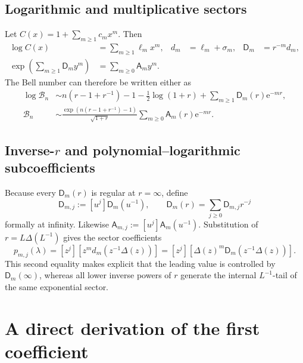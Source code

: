 \documentclass[11pt,a4paper]{article}
\theoremstyle{definition}
\theoremstyle{remark}
\newcommand{\Bell}{\mathcal B}
\newcommand{\ee}{\mathrm e}
\newcommand{\coef}[2]{[#1^{#2}]}
\newcommand{\cA}{\mathsf A}
\newcommand{\cD}{\mathsf D}
\begin{document}
\subsection{Logarithmic and multiplicative sectors}

Let \(C(x)=1+\sum_{m\ge1}c_mx^m\).  Then
\begin{align}
 \log C(x)&=\sum_{m\ge1}\ell_mx^m,
 &d_m&=\ell_m+\sigma_m,
 &\cD_m&=r^{-m}d_m,
 \label{eq:dict-log}\\
 \exp\!\left(\sum_{m\ge1}\cD_my^m\right)
 &=\sum_{m\ge0}\cA_my^m.
 \label{eq:dict-mult}
\end{align}
The Bell number can therefore be written either as
\begin{align}
 \log\Bell_n
 &\sim n(r-1+r^{-1})-1-\tfrac12\log(1+r)
       +\sum_{m\ge1}\cD_m(r)\ee^{-mr},
 \label{eq:dict-logbell}\\
 \Bell_n
 &\sim \frac{\exp(n(r-1+r^{-1})-1)}{\sqrt{1+r}}
       \sum_{m\ge0}\cA_m(r)\ee^{-mr}.
 \label{eq:dict-multbell}
\end{align}

\subsection{Inverse-\texorpdfstring{\(r\)}{r} and polynomial--logarithmic subcoefficients}

Because every \(\cD_m(r)\) is regular at \(r=\infty\), define
\begin{equation}\label{eq:Dmk-def}
 \cD_{m,j}:=\coef{u}{j}\cD_m(u^{-1}),
 \qquad
 \cD_m(r)=\sum_{j\ge0}\cD_{m,j}r^{-j}
\end{equation}
formally at infinity.  Likewise
\(\cA_{m,j}:=\coef{u}{j}\cA_m(u^{-1})\).  Substitution of
\(r=L\Delta(L^{-1})\) gives the sector coefficients
\begin{equation}\label{eq:sector-double-extraction}
 p_{m,j}(\lambda)
 =\coef{z}{j}
   \left[z^m d_m\!\left(z^{-1}\Delta(z)\right)\right]
 =\coef{z}{j}
   \left[\Delta(z)^m\cD_m\!\left(z^{-1}\Delta(z)\right)\right].
\end{equation}
This second equality makes explicit that the leading value is controlled by
\(\cD_m(\infty)\), whereas all lower inverse powers of \(r\) generate the
internal \(L^{-1}\)-tail of the same exponential sector.

\section{A direct derivation of the first coefficient}\label{app:c1proof}
\end{document}
